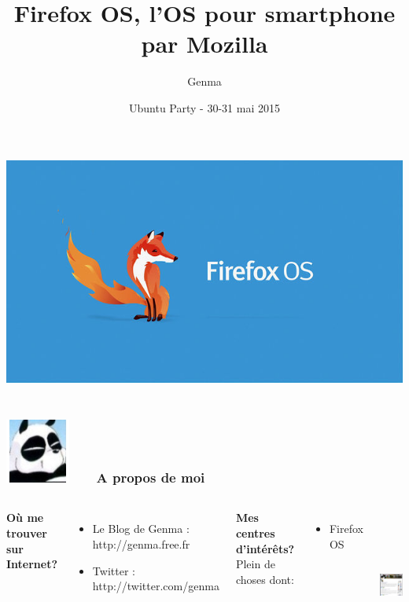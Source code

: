 \documentclass{beamer}
\title[Firefox OS, l'OS pour smartphone par Mozilla]{Firefox OS, l'OS pour smartphone par Mozilla}
\date{Ubuntu Party - 30-31 mai 2015}
\author{Genma}
\begin{document}
\begin{frame}
	\titlepage
	\begin{center}		
	\includegraphics[scale=0.2]{./images/firefox-os.jpg}
		\\	
	\\[2.5ex]
		{\tiny\CcNote{\CcLongnameByNcSa}}
		\vspace*{-2.5ex}
	\end{center}
\end{frame}

\begin{frame}
\frametitle{\includegraphics[scale=0.4]{./images/Genma.jpg} \ \ \  A propos de moi  }
\begin{columns}[c] 
\textbf{Où me trouver sur Internet?}
\begin{itemize}
\item Le Blog de Genma : http://genma.free.fr
\item Twitter : http://twitter.com/genma
\end{itemize}
\textbf{Mes centres d'intérêts?}
\\ Plein de choses dont:
\begin{itemize}
\item Firefox OS
\end{itemize}

\includegraphics[width=5cm,height=5cm]{./images/blog.png} 
\end{columns}
\end{frame}
\end{document}
